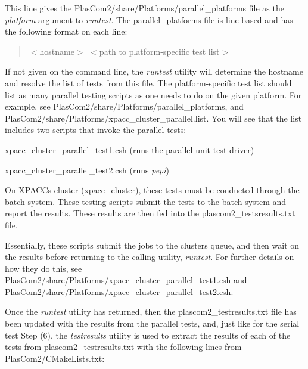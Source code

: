 This line gives the {\ttfamily Plas\+Com2/share/\+Platforms/parallel\+\_\+platforms} file as the {\itshape platform} argument to {\itshape runtest}. The parallel\+\_\+platforms file is line-\/based and has the following format on each line\+: \begin{quote}
$<$hostname$>$ $<$path to platform-\/specific test list$>$ \end{quote}
If not given on the command line, the {\itshape runtest} utility will determine the hostname and resolve the list of tests from this file. The platform-\/specific test list should list as many parallel testing scripts as one needs to do on the given platform. For example, see {\ttfamily Plas\+Com2/share/\+Platforms/parallel\+\_\+platforms}, and {\ttfamily Plas\+Com2/share/\+Platforms/xpacc\+\_\+cluster\+\_\+parallel.\+list}. You will see that the list includes two scripts that invoke the parallel tests\+:
\begin{DoxyEnumerate}
\item xpacc\+\_\+cluster\+\_\+parallel\+\_\+test1.\+csh (runs the parallel unit test driver)
\item xpacc\+\_\+cluster\+\_\+parallel\+\_\+test2.\+csh (runs {\itshape pepi})
\end{DoxyEnumerate}

On X\+P\+A\+CC\textquotesingle{}s cluster (xpacc\+\_\+cluster), these tests must be conducted through the batch system. These testing scripts submit the tests to the batch system and report the results. These results are then fed into the {\ttfamily plascom2\+\_\+testsresults.\+txt} file.

Essentially, these scripts submit the jobs to the cluster\textquotesingle{}s queue, and then wait on the results before returning to the calling utility, {\itshape runtest}. For further details on how they do this, see {\ttfamily Plas\+Com2/share/\+Platforms/xpacc\+\_\+cluster\+\_\+parallel\+\_\+test1.\+csh} and {\ttfamily Plas\+Com2/share/\+Platforms/xpacc\+\_\+cluster\+\_\+parallel\+\_\+test2.\+csh}.

Once the {\itshape runtest} utility has returned, then the {\ttfamily plascom2\+\_\+testresults.\+txt} file has been updated with the results from the parallel tests, and, just like for the serial test Step (6), the {\itshape testresults} utility is used to extract the results of each of the tests from {\ttfamily plascom2\+\_\+testresults.\+txt} with the following lines from {\ttfamily Plas\+Com2/\+C\+Make\+Lists.\+txt}\+:

